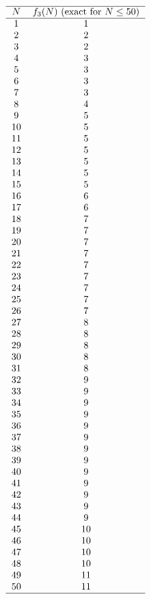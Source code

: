 \[
\begin{tabular}{cc}
 \hline
$N$ & $f_3(N)$ (exact for $N\le 50$)\\ \hline
1 & 1\\
2 & 2\\
3 & 2\\
4 & 3\\
5 & 3\\
6 & 3\\
7 & 3\\
8 & 4\\
9 & 5\\
10 & 5\\
11 & 5\\
12 & 5\\
13 & 5\\
14 & 5\\
15 & 5\\
16 & 6\\
17 & 6\\
18 & 7\\
19 & 7\\
20 & 7\\
21 & 7\\
22 & 7\\
23 & 7\\
24 & 7\\
25 & 7\\
26 & 7\\
27 & 8\\
28 & 8\\
29 & 8\\
30 & 8\\
31 & 8\\
32 & 9\\
33 & 9\\
34 & 9\\
35 & 9\\
36 & 9\\
37 & 9\\
38 & 9\\
39 & 9\\
40 & 9\\
41 & 9\\
42 & 9\\
43 & 9\\
44 & 9\\
45 & 10\\
46 & 10\\
47 & 10\\
48 & 10\\
49 & 11\\
50 & 11\\
\hline
\end{tabular}
\]


